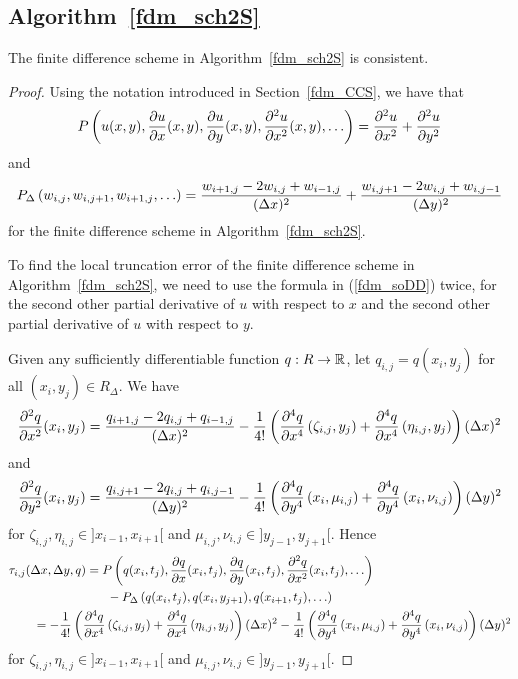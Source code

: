 \subsection{Algorithm~\ref{fdm_sch2S}} 

\begin{prop}\label{fdm_sch2S_const}
The finite difference scheme in Algorithm~\ref{fdm_sch2S} is consistent.
\end{prop}

\begin{proof}
Using the notation introduced in Section~\ref{fdm_CCS}, we have that
\[
P\left(u(x,y), \frac{\partial{u}}{\partial{x}}(x,y), \frac{\partial{u}}{\partial{y}}(x,y),
  \frac{\partial^{2}{u}}{\partial{x}^{2}}(x,y), \ldots \right)
= \frac{\partial^{2}{u}}{\partial{x}^{2}} + \frac{\partial^{2}{u}}{\partial{y}^{2}}
\]
and
\[
P_\Delta\left(w_{i,j}, w_{i,j+1}, w_{i+1,j}, \ldots\right)
= \frac{w_{i+1,j} - 2w_{i,j} + w_{i-1,j}}{(\Delta{x})^2}
+ \frac{w_{i,j+1} - 2w_{i,j} + w_{i,j-1}}{(\Delta{y})^2}
\]
for the finite difference scheme in Algorithm~\ref{fdm_sch2S}.

To find the local truncation error of the finite difference scheme in
Algorithm~\ref{fdm_sch2S}, we need to use the formula in
(\ref{fdm_soDD}) twice, for the second other partial derivative of $u$
with respect to $x$ and the second other partial derivative of $u$
with respect to $y$.

Given any sufficiently differentiable function
$q:R \to \mathbb{R}$, let $q_{i,j}= q(x_i,y_j)$ for all $(x_i,y_j) \in R_\Delta$. 
We have
\[
\frac{\partial^{2}{q}}{\partial{x}^{2}}(x_i,y_j) =
\frac{q_{i+1,j} - 2q_{i,j} + q_{i-1,j}}{(\Delta{x})^2}
- \frac{1}{4!} \left( \frac{\partial^{4}{q}}{\partial{x}^{4}}\left(\zeta_{i,j},y_j\right)
  + \frac{\partial^{4}{q}}{\partial{x}^{4}}\left(\eta_{i,j},y_j\right) \right) (\Delta{x})^2
\]
and
\[
\frac{\partial^{2}{q}}{\partial{y}^{2}}(x_i,y_j) =
\frac{q_{i,j+1} - 2q_{i,j} + q_{i,j-1}}{(\Delta{y})^2}
- \frac{1}{4!} \left( \frac{\partial^{4}{q}}{\partial{y}^{4}}\left(x_i,\mu_{i,j} \right)
+ \frac{\partial^{4}{q}}{\partial{y}^{4}}\left(x_i,\nu_{i,j} \right) \right) (\Delta{y})^2
\]
for $\zeta_{i,j}, \eta_{i,j} \in ]x_{i-1},x_{i+1}[$ and
$\mu_{i,j}, \nu_{i,j} \in ]y_{j-1},y_{j+1}[$.  Hence
\begin{align*}
&\tau_{i,j}(\Delta{x},\Delta{y},q)
= P\left(q(x_i,t_j), \frac{\partial{q}}{\partial{x}}(x_i,t_j), \frac{\partial{q}}{\partial{y}}(x_i,t_j),
  \frac{\partial^{2}{q}}{\partial{x}^{2}}(x_i,t_j), \ldots \right) \\
&\qquad\qquad\qquad\qquad
- P_\Delta\left(q(x_i,t_j), q(x_i,y_{j+1}), q(x_{i+1},t_j), \ldots\right) \\
&\qquad
= - \frac{1}{4!} \left( \frac{\partial^{4}{q}}{\partial{x}^{4}}\left(\zeta_{i,j},y_j\right)
+ \frac{\partial^{4}{q}}{\partial{x}^{4}}\left(\eta_{i,j},y_j\right) \right) (\Delta{x})^2
- \frac{1}{4!} \left( \frac{\partial^{4}{q}}{\partial{y}^{4}}\left(x_i,\mu_{i,j} \right)
+ \frac{\partial^{4}{q}}{\partial{y}^{4}}\left(x_i,\nu_{i,j} \right) \right) (\Delta{y})^2
\end{align*}
for $\zeta_{i,j}, \eta_{i,j} \in ]x_{i-1},x_{i+1}[$ and
$\mu_{i,j}, \nu_{i,j} \in ]y_{j-1},y_{j+1}[$.


\end{proof}
